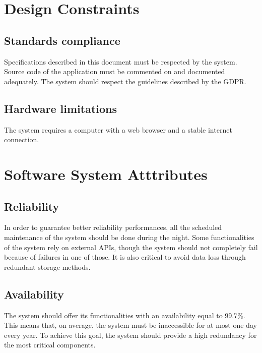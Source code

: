 \section{Design Constraints}

\subsection{Standards compliance}
Specifications described in this document must be respected by the system. Source code of the application
must be commented on and documented adequately. The system should respect the guidelines described
by the GDPR.\\

\subsection{Hardware limitations}
The system requires a computer with a web browser and a stable internet connection.\\


\section{Software System Atttributes}

\subsection{Reliability}
In order to guarantee better reliability performances, all the scheduled maintenance of the system should
be done during the night. Some functionalities of the system rely on external APIs, though the system should 
not completely fail because of failures in one of those. It is also critical to avoid data loss through 
redundant storage methods.

\subsection{Availability}
The system should offer its functionalities with an availability equal to 99.7\%. This means that, on average, 
the system must be inaccessible for at most one day every year. To achieve this goal, the system should 
provide a high redundancy for the most critical components.

